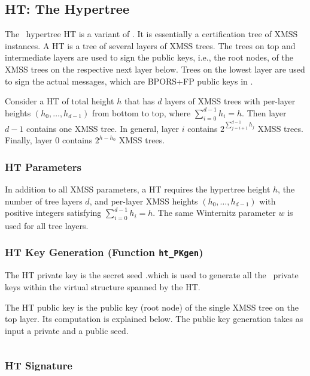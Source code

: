 \subsection{HT: The Hypertree}

The \SPHINCSA\ hypertree HT is a variant of \XMSSMT. It is essentially a certification tree of XMSS instances. A HT is a tree of several layers of XMSS trees. The trees on top and intermediate layers are used to sign the public keys, i.e., the root nodes, of the XMSS trees on the respective next layer below. Trees on the lowest layer are used to sign the actual messages, which are BPORS+FP public keys in \SPHINCSA.

Consider a HT of total height $h$ that has $d$ layers of XMSS trees with per-layer heights $(h_0,\ldots,h_{d-1})$ from bottom to top, where $\sum_{i=0}^{d-1} h_i = h$. Then layer $d-1$ contains one XMSS tree. In general, layer $i$ contains $2^{\sum_{j=i+1}^{d-1} h_j}$ XMSS trees. Finally, layer $0$ contains $2^{h-h_0}$ XMSS trees.

\subsubsection{HT Parameters}
\label{sec:htpara}
In addition to all XMSS parameters, a HT requires the hypertree height $h$, the number of tree layers $d$, and per-layer XMSS heights $(h_0,\ldots,h_{d-1})$ with positive integers satisfying $\sum_{i=0}^{d-1} h_i = h$. The same Winternitz parameter $w$ is used for all tree layers.


\subsubsection{HT Key Generation (Function \texttt{ht\_PKgen})}

The HT private key is the secret seed \sk.\seed which is used to generate all the \WOTSCS\ private keys within the virtual structure spanned by the HT.

The HT public key is the public key (root node) of the single XMSS tree on the top layer. Its computation is explained below. The public key generation takes as input a private and a public seed.

\begin{algorithm}
\inputminted[breaklines,linenos,tabsize=2,mathescape,escapeinside=||]{C}{paper/code/ht_PKgen.cs}
\caption{\texttt{ht\_PKgen} --- Generating an HT public key.}
\label{alg:htpkgen}
\end{algorithm}
\subsubsection{HT Signature}

